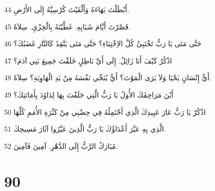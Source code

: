 \par 44 أَبْطَلْتَ بَهَاءَهُ وَأَلْقَيْتَ كُرْسِيَّهُ إِلَى الأَرْضِ.
\par 45 قَصَّرْتَ أَيَّامَ شَبَابِهِ. غَطَّيْتَهُ بِالْخِزْيِ. سِلاَهْ.
\par 46 حَتَّى مَتَى يَا رَبُّ تَخْتَبِئُ كُلَّ الاِخْتِبَاءِ؟ حَتَّى مَتَى يَتَّقِدُ كَالنَّارِ غَضَبُكَ؟
\par 47 اذْكُرْ كَيْفَ أَنَا زَائِلٌ. إِلَى أَيِّ بَاطِلٍ خَلَقْتَ جَمِيعَ بَنِي آدَمَ؟
\par 48 أَيُّ إِنْسَانٍ يَحْيَا وَلاَ يَرَى الْمَوْتَ؟ أَيٌّ يُنَجِّي نَفْسَهُ مِنْ يَدِ الْهَاوِيَةِ؟ سِلاَهْ.
\par 49 أَيْنَ مَرَاحِمُكَ الأُوَلُ يَا رَبُّ الَّتِي حَلَفْتَ بِهَا لِدَاوُدَ بِأَمَانَتِكَ؟
\par 50 اذْكُرْ يَا رَبُّ عَارَ عَبِيدِكَ الَّذِي أَحْتَمِلُهُ فِي حِضْنِي مِنْ كَثْرَةِ الأُمَمِ كُلِّهَا
\par 51 الَّذِي بِهِ عَيَّرَ أَعْدَاؤُكَ يَا رَبُّ الَّذِينَ عَيَّرُوا آثَارَ مَسِيحِكَ.
\par 52 مُبَارَكٌ الرَّبُّ إِلَى الدَّهْرِ. آمِينَ فَآمِينَ.

\chapter{90}

